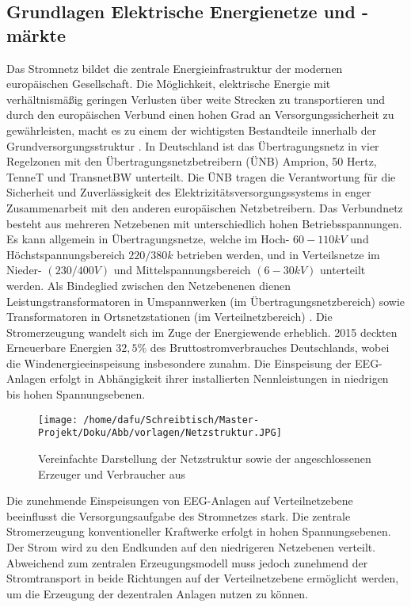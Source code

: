 \documentclass[onecolumn,10pt,titlepage]{article}
\begin{document}
\subsection{Grundlagen Elektrische Energienetze und -märkte}
\label{sub_GrundET}
Das Stromnetz bildet die zentrale Energieinfrastruktur der modernen europäischen Gesellschaft. Die Möglichkeit, elektrische Energie mit verhältnismäßig geringen Verlusten über weite Strecken zu transportieren und durch den europäischen Verbund einen hohen Grad an Versorgungssicherheit zu gewährleisten, macht es zu einem der wichtigsten Bestandteile innerhalb der Grundversorgungsstruktur \cite{Crastan2018}.
 In Deutschland ist das Übertragungsnetz in vier Regelzonen mit den Übertragungsnetzbetreibern (ÜNB) Amprion, 50 Hertz, TenneT und TransnetBW unterteilt. Die ÜNB tragen die Verantwortung für die Sicherheit und Zuverlässigkeit des Elektrizitätsversorgungssystems in enger Zusammenarbeit mit den anderen europäischen Netzbetreibern. Das Verbundnetz besteht aus mehreren Netzebenen mit unterschiedlich hohen Betriebsspannungen. Es kann allgemein in Übertragungsnetze, welche im  Hoch- $60-110kV$ und Höchstspannungsbereich $220/380k$ betrieben werden, und in Verteilsnetze im Nieder- $(230/400V)$ und Mittelspannungsbereich $(6-30 kV)$ unterteilt werden. Als Bindeglied zwischen den Netzebenenen dienen Leistungstransformatoren in Umspannwerken (im Übertragungsnetzbereich) sowie Transformatoren in Ortsnetzstationen (im Verteilnetzbereich) \cite{Konstantin.2013}. Die Stromerzeugung wandelt sich im Zuge der Energiewende erheblich.  2015 deckten Erneuerbare Energien $32,5\%$ des Bruttostromverbrauches Deutschlands, wobei die Windenergieeinspeisung insbesondere zunahm.\cite{Konstantin.2013} Die Einspeisung der EEG-Anlagen erfolgt in Abhängigkeit ihrer installierten Nennleistungen in niedrigen bis hohen Spannungsebenen.

\begin{figure}[H]
	\centering
	\texttt{[image: /home/dafu/Schreibtisch/Master-Projekt/Doku/Abb/vorlagen/Netzstruktur.JPG]}
	\caption[Vereinfachte Darstellung der Netzstruktur]{Vereinfachte Darstellung der Netzstruktur sowie der angeschlossenen Erzeuger und Verbraucher aus \cite{Zapf.2017}}
	\label{fig:Netzstruktur}
\end{figure}

Die zunehmende Einspeisungen von EEG-Anlagen auf Verteilnetzebene beeinflusst die Versorgungsaufgabe des Stromnetzes stark. Die zentrale Stromerzeugung konventioneller Kraftwerke erfolgt in hohen Spannungsebenen. Der Strom wird zu den Endkunden auf den niedrigeren Netzebenen verteilt. Abweichend zum zentralen Erzeugungsmodell muss jedoch zunehmend der Stromtransport in beide Richtungen auf der Verteilnetzebene ermöglicht werden, um die Erzeugung der dezentralen Anlagen nutzen zu können.
\end{document}
